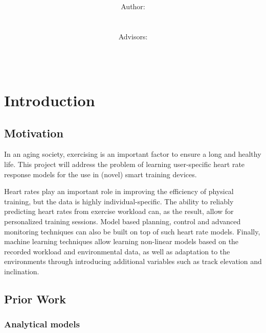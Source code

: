 \documentclass[12pt]{article}
\title{\normalsize \textsc{\hmwkAuthorSchool}   %
    \\[2.0cm]                                   %
    \HRule{0.5pt} \\                            %
    \LARGE \textbf{\uppercase{\hmwkTopic}}
    \HRule{2pt} \\ [0.5cm]                      %
    \hmwkTitle\\[0.5cm]
    \normalsize \hmwkDueDate\\
}
\author{
    \\[4.0cm]
    Author:\\
    \hmwkAuthorName\\
    \ \\
    Advisors:\\
    \hmwkAdvisorFirst\\
    \hmwkAdvisorSecond\\
}
\date{}
\begin{document}
    \maketitle
    \thispagestyle{firststyle}
    \newpage

\section{Introduction}

    \subsection{Motivation}

    In an aging society, exercising is an important factor to ensure a long and healthy life. This project will address the problem of learning user-specific heart rate response models for the use in (novel) smart training devices.

    Heart rates play an important role in improving the efficiency of physical training, but the data is highly individual-specific. The ability to reliably predicting heart rates from exercise workload can, as the result, allow for personalized training sessions. Model based planning, control and advanced monitoring techniques can also be built on top of such heart rate models. Finally, machine learning techniques allow learning non-linear models based on the recorded workload and environmental data, as well as adaptation to the environments through introducing additional variables such as track elevation and inclination.

    \subsection{Prior Work}

        \subsubsection{Analytical models}
\end{document}
